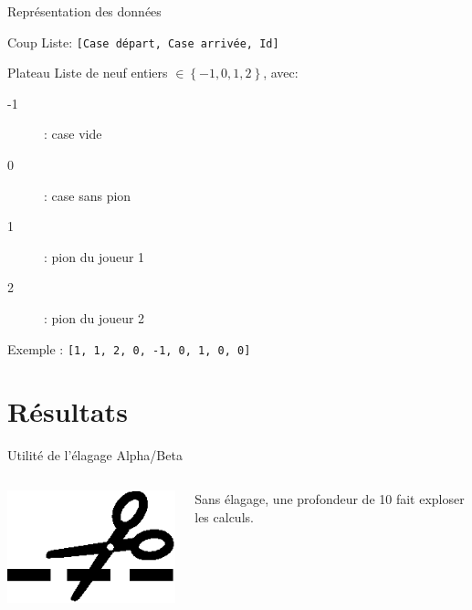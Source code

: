 \documentclass[compress, 12pt]{beamer}
\begin{document}
\begin{frame}{Représentation des données}
    \begin{block}{Coup}
          Liste: \texttt{[Case départ, Case arrivée, Id]}
    \end{block}
    \begin{block}{Plateau}
        Liste de neuf entiers $\in \left\{-1, 0, 1, 2\right\}$, avec:
        \begin{description}
	        \item [-1] : case vide
	        \item [0] : case sans pion
	        \item [1] : pion du joueur 1
	        \item [2] : pion du joueur 2
        \end{description}
        Exemple : \texttt{[1, 1, 2, 0, -1, 0, 1, 0, 0]}
    \end{block}
\end{frame}

\section{Résultats}

\begin{frame}{Utilité de l'élagage Alpha/Beta}
    \begin{columns}
        \begin{column}{.2\textwidth}
            \includegraphics[width=1.3\textwidth]{./pix/sym_cut}
        \end{column}
        \begin{column}{.6\textwidth}
            \begin{center}
                Sans élagage, une profondeur de 10 fait exploser les calculs.
            \end{center}
        \end{column}
    \end{columns}
\end{frame}
\end{document}
